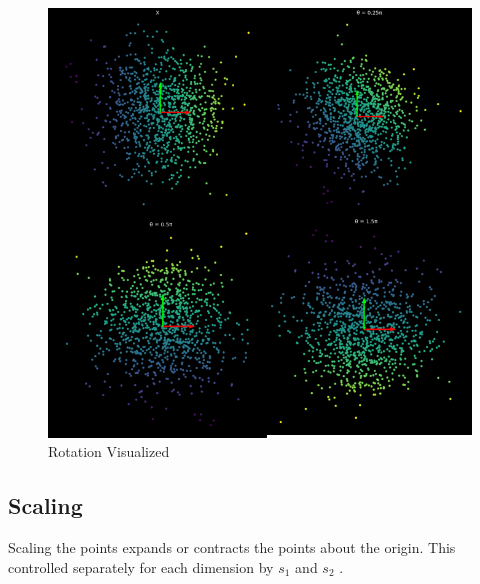 \begin{figure}[h!]
\begin{center}
\includegraphics{labs/01/images/Rotation.png}
\end{center} 
\caption{Rotation Visualized}
\label{fig:mon}
\end{figure}


\subsection{Scaling}
Scaling the points expands or contracts the points about the origin. 
This controlled separately for each dimension by \(s_1\) and \(s_2\) .

